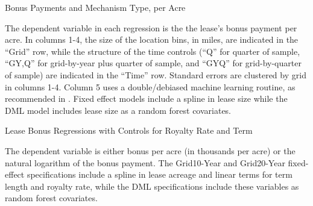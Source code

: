 \begin{appendices}
\begin{table}[H]
	\begin{center}
	\begin{threeparttable}
		\caption{Bonus Payments and Mechanism Type, per Acre}
		\label{tab:table_main_bonus_levels}
		\small
		            
		\begin{tablenotes}
		\footnotesize
		\item The dependent variable in each regression is the the lease's bonus payment per acre. In columns 1-4, the size of the location bins, in miles, are indicated in the ``Grid'' row, while the structure of the time controls (``Q'' for quarter of sample, ``GY,Q'' for grid-by-year plus quarter of sample, and ``GYQ'' for grid-by-quarter of sample) are indicated in the ``Time'' row.  Standard errors are clustered by grid in columns 1-4.  Column 5 uses a double/debiased machine learning routine, as recommended in \cite{chernozhukov2018double}.  Fixed effect models include a spline in lease size while the DML model includes lease size as a random forest covariates.  
		\end{tablenotes}
	\end{threeparttable}
	\end{center}
\end{table}



\addtolength{\tabcolsep}{-4pt}
\begin{table}[H]
	\begin{center}
	\begin{threeparttable}
	\caption{Lease Bonus Regressions with Controls for Royalty Rate and Term}
	\label{tab:BonusWithRoyaltyTerm}
	\small
	            
		\begin{tablenotes}
		\footnotesize
		\item The dependent variable is either bonus per acre (in thousands per acre) or the natural logarithm of the bonus payment.  The Grid10-Year and Grid20-Year fixed-effect specifications include a spline in lease acreage and linear terms for term length and royalty rate, while the DML specifications include these variables as  random forest covariates.     
		\end{tablenotes}	   
	\end{threeparttable}
	\end{center}
\end{table}


\end{appendices}
